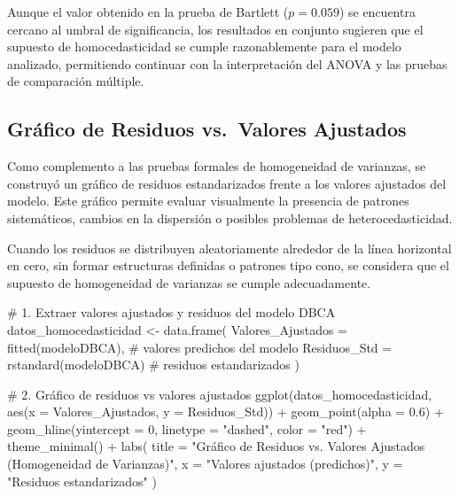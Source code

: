 \documentclass[
  spanish,
  letterpaper,
  DIV=11,
  numbers=noendperiod]{scrreprt}
\newenvironment{Shaded}{\begin{snugshade}}{\end{snugshade}}
\newcommand{\AttributeTok}[1]{\textcolor[rgb]{0.40,0.45,0.13}{#1}}
\newcommand{\CommentTok}[1]{\textcolor[rgb]{0.37,0.37,0.37}{#1}}
\newcommand{\DecValTok}[1]{\textcolor[rgb]{0.68,0.00,0.00}{#1}}
\newcommand{\FloatTok}[1]{\textcolor[rgb]{0.68,0.00,0.00}{#1}}
\newcommand{\FunctionTok}[1]{\textcolor[rgb]{0.28,0.35,0.67}{#1}}
\newcommand{\NormalTok}[1]{\textcolor[rgb]{0.00,0.23,0.31}{#1}}
\newcommand{\OtherTok}[1]{\textcolor[rgb]{0.00,0.23,0.31}{#1}}
\newcommand{\SpecialCharTok}[1]{\textcolor[rgb]{0.37,0.37,0.37}{#1}}
\newcommand{\StringTok}[1]{\textcolor[rgb]{0.13,0.47,0.30}{#1}}
\begin{document}
Aunque el valor obtenido en la prueba de Bartlett (\(p = 0.059\)) se
encuentra cercano al umbral de significancia, los resultados en conjunto
sugieren que el supuesto de homocedasticidad se cumple razonablemente
para el modelo analizado, permitiendo continuar con la interpretación
del ANOVA y las pruebas de comparación múltiple.

\subsection{Gráfico de Residuos vs.~Valores
Ajustados}\label{gruxe1fico-de-residuos-vs.-valores-ajustados}

Como complemento a las pruebas formales de homogeneidad de varianzas, se
construyó un gráfico de residuos estandarizados frente a los valores
ajustados del modelo. Este gráfico permite evaluar visualmente la
presencia de patrones sistemáticos, cambios en la dispersión o posibles
problemas de heterocedasticidad.

Cuando los residuos se distribuyen aleatoriamente alrededor de la línea
horizontal en cero, sin formar estructuras definidas o patrones tipo
cono, se considera que el supuesto de homogeneidad de varianzas se
cumple adecuadamente.

\begin{Shaded}
\begin{Highlighting}[]
\CommentTok{\# 1. Extraer valores ajustados y residuos del modelo DBCA}
\NormalTok{datos\_homocedasticidad }\OtherTok{\textless{}{-}} \FunctionTok{data.frame}\NormalTok{(}
  \AttributeTok{Valores\_Ajustados =} \FunctionTok{fitted}\NormalTok{(modeloDBCA),     }\CommentTok{\# valores predichos del modelo}
  \AttributeTok{Residuos\_Std =} \FunctionTok{rstandard}\NormalTok{(modeloDBCA)        }\CommentTok{\# residuos estandarizados}
\NormalTok{)}

\CommentTok{\# 2. Gráfico de residuos vs valores ajustados}
\FunctionTok{ggplot}\NormalTok{(datos\_homocedasticidad, }\FunctionTok{aes}\NormalTok{(}\AttributeTok{x =}\NormalTok{ Valores\_Ajustados, }\AttributeTok{y =}\NormalTok{ Residuos\_Std)) }\SpecialCharTok{+}
  \FunctionTok{geom\_point}\NormalTok{(}\AttributeTok{alpha =} \FloatTok{0.6}\NormalTok{) }\SpecialCharTok{+}
  \FunctionTok{geom\_hline}\NormalTok{(}\AttributeTok{yintercept =} \DecValTok{0}\NormalTok{, }\AttributeTok{linetype =} \StringTok{"dashed"}\NormalTok{, }\AttributeTok{color =} \StringTok{"red"}\NormalTok{) }\SpecialCharTok{+}
  \FunctionTok{theme\_minimal}\NormalTok{() }\SpecialCharTok{+}
  \FunctionTok{labs}\NormalTok{(}
    \AttributeTok{title =} \StringTok{"Gráfico de Residuos vs. Valores Ajustados (Homogeneidad de Varianzas)"}\NormalTok{,}
    \AttributeTok{x =} \StringTok{"Valores ajustados (predichos)"}\NormalTok{,}
    \AttributeTok{y =} \StringTok{"Residuos estandarizados"}
\NormalTok{  )}
\end{Highlighting}
\end{Shaded}
\end{document}
